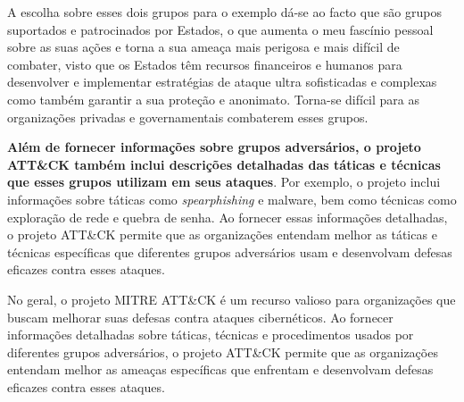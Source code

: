 A escolha sobre esses dois grupos para o exemplo dá-se ao facto que são grupos suportados e patrocinados por Estados, o que aumenta o meu fascínio pessoal sobre as suas ações e torna a sua ameaça mais perigosa e mais difícil de combater, visto que os Estados têm recursos financeiros e humanos para desenvolver e implementar estratégias de ataque ultra sofisticadas e complexas como também garantir a sua proteção e anonimato. Torna-se difícil para as organizações privadas e governamentais combaterem esses grupos.

\textbf{Além de fornecer informações sobre grupos adversários, o projeto ATT\&CK também inclui descrições detalhadas das táticas e técnicas que esses grupos utilizam em seus ataques}. Por exemplo, o projeto inclui informações sobre táticas como \textit{spearphishing} e malware, bem como técnicas como exploração de rede e quebra de senha. Ao fornecer essas informações detalhadas, o projeto ATT\&CK permite que as organizações entendam melhor as táticas e técnicas específicas que diferentes grupos adversários usam e desenvolvam defesas eficazes contra esses ataques.

No geral, o projeto MITRE ATT\&CK é um recurso valioso para organizações que buscam melhorar suas defesas contra ataques cibernéticos. Ao fornecer informações detalhadas sobre táticas, técnicas e procedimentos usados por diferentes grupos adversários, o projeto ATT\&CK permite que as organizações entendam melhor as ameaças específicas que enfrentam e desenvolvam defesas eficazes contra esses ataques.

\newpage
